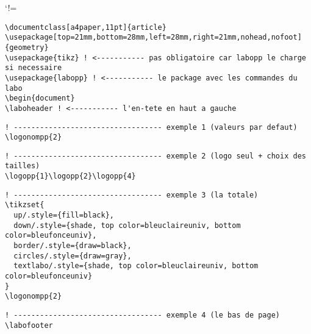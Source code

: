 \documentclass[a4paper,11pt]{article}
\begin{document}
\laboheader

\def\CommentChar{\char37}
\catcode`!=\active
\begin{Verbatim}[defineactive=\def!{\color{orange}\CommentChar}]
\documentclass[a4paper,11pt]{article}
\usepackage[top=21mm,bottom=28mm,left=28mm,right=21mm,nohead,nofoot]{geometry}
\usepackage{tikz} ! <----------- pas obligatoire car labopp le charge si necessaire
\usepackage{labopp} ! <----------- le package avec les commandes du labo
\begin{document}
\laboheader ! <----------- l'en-tete en haut a gauche
\end{Verbatim}


\begin{Verbatim}[defineactive=\def!{\color{orange}\CommentChar}]
! ---------------------------------- exemple 1 (valeurs par defaut)
\logonompp{2}
\end{Verbatim}

\begin{Verbatim}[defineactive=\def!{\color{orange}\CommentChar}]
! ---------------------------------- exemple 2 (logo seul + choix des tailles)
\logopp{1}\logopp{2}\logopp{4}
\end{Verbatim}


\begin{Verbatim}[defineactive=\def!{\color{orange}\CommentChar}]
! ---------------------------------- exemple 3 (la totale)
\tikzset{
  up/.style={fill=black},
  down/.style={shade, top color=bleuclaireuniv, bottom color=bleufonceuniv},
  border/.style={draw=black},
  circles/.style={draw=gray},
  textlabo/.style={shade, top color=bleuclaireuniv, bottom color=bleufonceuniv}
}
\logonompp{2}
\end{Verbatim}
{ %
}


\vfill

\begin{Verbatim}[defineactive=\def!{\color{orange}\CommentChar}]
! ---------------------------------- exemple 4 (le bas de page)
\labofooter
\end{Verbatim}
\labofooter
\end{document}
